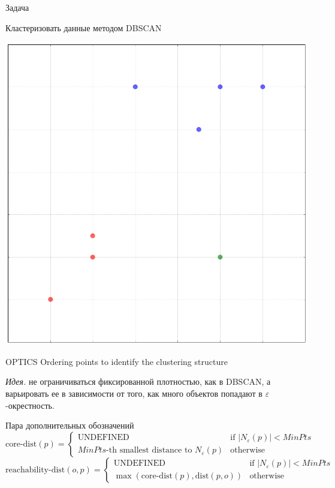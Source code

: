 \documentclass[aspectratio=169]{beamer}
\begin{document}
\begin{frame}{Задача}

Кластеризовать данные методом DBSCAN
\begin{center}
\includegraphics[height=0.7\textheight]{images/toy.png}
\end{center}

\end{frame}

\begin{frame}{OPTICS}
Ordering points to identify the clustering structure

\vspace{2em}
{\it Идея.} не ограничиваться фиксированной плотностью, как в DBSCAN, а варьировать ее в зависимости от того, как много объектов попадают в $\varepsilon$-окрестность.

\vspace{2em}
Пара дополнительных обозначений
\[
\text{core-dist}(p)=\begin{cases}\text{UNDEFINED} & \text{if } |N_\varepsilon(p)| < MinPts\\ MinPts\text{-th smallest distance to } N_\varepsilon(p) & \text{otherwise}\end{cases}
\]
\[
\text{reachability-dist}(o,p) = \begin{cases}\text{UNDEFINED} & \text{if } |N_\varepsilon(p)| < MinPts\\ \max(\text{core-dist}(p), \text{dist}(p,o)) & \text{otherwise}\end{cases}
\]

\end{frame}
\end{document}
